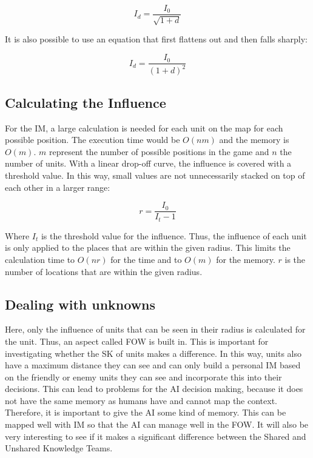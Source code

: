 \documentclass[]{report}
\begin{document}
	\begin{equation}
		I_{d} = \frac{I_{0}}{\sqrt{1 + d}}
	\end{equation}
	
	It is also possible to use an equation that first flattens out and then falls sharply: 
	
	\begin{equation}
		I_{d} = \frac{I_{0}}{(1 + d)^2}
	\end{equation}
	
	\subsection{Calculating the Influence}
	For the \ac{IM}, a large calculation is needed for each unit on the map for each possible position. The execution time would be $O(nm)$ and the memory is $O(m)$. $m$ represent the number of possible positions in the game and $n$ the number of units. With a linear drop-off curve, the influence is covered with a threshold value. In this way, small values are not unnecessarily stacked on top of each other in a larger range:
	
	\begin{equation}
		r = \frac{I_0}{I_t - 1}
	\end{equation}

	Where $I_t$ is the threshold value for the influence. Thus, the influence of each unit is only applied to the places that are within the given radius. This limits the calculation time to $O(nr)$ for the time and to $O(m)$ for the memory. $r$ is the number of locations that are within the given radius.
	
	\subsection{Dealing with unknowns} \label{ssec:dwu}
	Here, only the influence of units that can be seen in their radius is calculated for the unit. Thus, an aspect called \ac{FOW} is built in. This is important for investigating whether the \ac{SK} of units makes a difference. In this way, units also have a maximum distance they can see and can only build a personal \ac{IM} based on the friendly or enemy units they can see and incorporate this into their decisions. This can lead to problems for the \ac{AI} decision making, because it does not have the same memory as humans have and cannot map the context. Therefore, it is important to give the \ac{AI} some kind of memory. This can be mapped well with IM so that the \ac{AI} can manage well in the \ac{FOW}. It will also be very interesting to see if it makes a significant difference between the Shared and Unshared Knowledge Teams.
	
\end{document}
